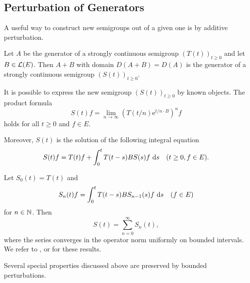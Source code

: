 \subsection{Perturbation of Generators} \label{subsec:a2-1.se8}
A useful way to construct new semigroups out of a given one is by additive perturbation.%
\begin{theorem}\label{thm:a2-1.29}
Let $A$ be the generator of a strongly continuous semigroup $(T(t))_{t \geq 0}$ and let $B \in \mathcal{L}(E)$.
Then $A + B$ with domain $D(A+B) = D(A)$ is the generator of a strongly continuous semigroup $(S(t))_{t \geq 0}$.
\end{theorem}

It is possible to express the new semigroup $(S(t))_{t \geq 0}$ by known objects.
The product formula
\begin{equation}\label{eq:a2-1.8}
    S(t)f = \lim_{n \to \infty} (T(t/n)\mathrm{e}^{t/n \cdot B})^{n}f
\end{equation}
holds for all $t \geq 0$ and $f \in E$.

Moreover, $S(t)$ is the solution of the following integral equation
\begin{equation}\label{eq:a2-1.9}
    S(t)f = T(t)f + \int_{0}^{t} T(t-s)BS(s)f\, \mathop{}\!\mathrm{d}{s} \quad (t \geq 0, f \in E).
\end{equation}

Let $S_{0}(t) = T(t)$ and
\begin{equation}\label{eq:a2-1.10}
    S_{n}(t)f = \int_{0}^{t} T(t-s)BS_{n-1}(s)f\, \mathop{}\!\mathrm{d}{s} \quad (f \in E)
\end{equation}
for $n \in \mathbb{N}$. Then
\begin{equation}\label{eq:a2-1.11}
    S(t) = \sum_{n=0}^{\infty} S_{n}(t),
\end{equation}
where the series converges in the operator norm uniformly on bounded intervals.
We refer to \citet[III.1]{davies:1980}, \citet[I.6]{goldstein:1985a} or \citet[Chapter 3]{pazy:1983} for these results.

Several special properties discussed above are preserved by bounded perturbations.


